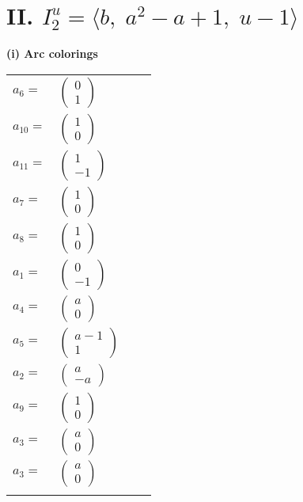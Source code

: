 \documentclass[1p]{elsarticle_modified}
\theoremstyle{definition}
\begin{document}
\centering \section*{II. $I^u_{2}= \langle b,\;a^2- a+1,\;u-1 \rangle$}
\flushleft \textbf{(i) Arc colorings}\\
\begin{tabular}{m{7pt} m{180pt} m{7pt} m{180pt} }
\flushright $a_{6}=$&$\begin{pmatrix}0\\1\end{pmatrix}$ \\
\flushright $a_{10}=$&$\begin{pmatrix}1\\0\end{pmatrix}$ \\
\flushright $a_{11}=$&$\begin{pmatrix}1\\-1\end{pmatrix}$ \\
\flushright $a_{7}=$&$\begin{pmatrix}1\\0\end{pmatrix}$ \\
\flushright $a_{8}=$&$\begin{pmatrix}1\\0\end{pmatrix}$ \\
\flushright $a_{1}=$&$\begin{pmatrix}0\\-1\end{pmatrix}$ \\
\flushright $a_{4}=$&$\begin{pmatrix}a\\0\end{pmatrix}$ \\
\flushright $a_{5}=$&$\begin{pmatrix}a-1\\1\end{pmatrix}$ \\
\flushright $a_{2}=$&$\begin{pmatrix}a\\- a\end{pmatrix}$ \\
\flushright $a_{9}=$&$\begin{pmatrix}1\\0\end{pmatrix}$ \\
\flushright $a_{3}=$&$\begin{pmatrix}a\\0\end{pmatrix}$\\ \flushright $a_{3}=$&$\begin{pmatrix}a\\0\end{pmatrix}$\\&\end{tabular}
\end{document}
